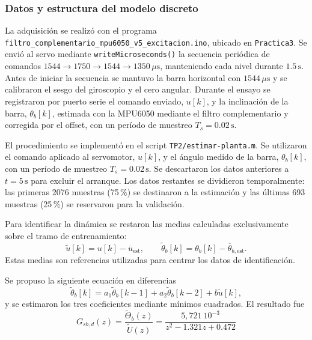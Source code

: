 \documentclass[a4paper, twoside, 10pt, spanish]{article}
\numberwithin{table}{section}
\begin{document}
    \subsubsection{Datos y estructura del modelo discreto}
    La adquisición se realizó con el programa \texttt{filtro\_complementario\_mpu6050\_v5\_excitacion.ino}, ubicado en \texttt{Practica3}. Se envió al servo mediante \texttt{writeMicroseconds()} la secuencia periódica de comandos $1544 \rightarrow 1750 \rightarrow 1544 \rightarrow 1350\,\mu\text{s}$, manteniendo cada nivel durante $1.5\,\text{s}$. Antes de iniciar la secuencia se mantuvo la barra horizontal con $1544\,\mu\text{s}$ y se calibraron el sesgo del giroscopio y el cero angular. Durante el ensayo se registraron por puerto serie el comando enviado, $u[k]$, y la inclinación de la barra, $\theta_b[k]$, estimada con la MPU6050 mediante el filtro complementario y corregida por el offset, con un período de muestreo $T_s=0.02\,\text{s}$.

    El procedimiento se implementó en el script \texttt{TP2/estimar-planta.m}. Se utilizaron el comando aplicado al servomotor, $u[k]$, y el ángulo medido de la barra, $\theta_b[k]$, con un período de muestreo $T_s=0.02\,\text{s}$. Se descartaron los datos anteriores a $t=5\,\text{s}$ para excluir el arranque. Los datos restantes se dividieron temporalmente: las primeras 2076 muestras (75\,\%) se destinaron a la estimación y las últimas 693 muestras (25\,\%) se reservaron para la validación.

    Para identificar la dinámica se restaron las medias calculadas exclusivamente sobre el tramo de entrenamiento:
    \[
        \widetilde u[k]=u[k]-\overline u_{\mathrm{est}},\qquad
        \widetilde\theta_b[k]=\theta_b[k]-\overline\theta_{b,\mathrm{est}}.
    \]
    Estas medias son referencias utilizadas para centrar los datos de identificación.

    Se propuso la siguiente ecuación en diferencias
    \begin{equation}
        \widetilde\theta_b[k] = a_1\widetilde\theta_b[k-1]
        + a_2\widetilde\theta_b[k-2] + b\widetilde u[k],
        \label{eq:regresion_servo}
    \end{equation}
    y se estimaron los tres coeficientes mediante mínimos cuadrados. El resultado fue
    \begin{equation}
        G_{sb,d}(z)=\frac{\widetilde\Theta_b(z)}{\widetilde U(z)}
        =\frac{5,721 \ 10^{-3}}{z^2-1.321z+0.472}
        \label{eq:servo_discreto_identificado}
    \end{equation}
\end{document}
